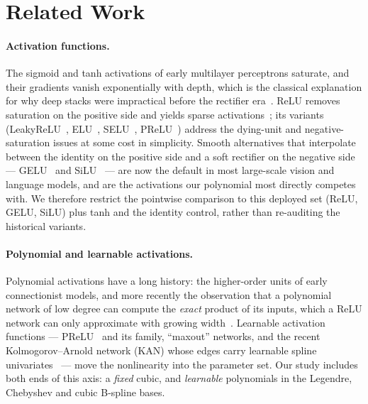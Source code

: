 \section{Related Work}
\label{sec:related}

\paragraph{Activation functions.}
The sigmoid and tanh activations of early multilayer perceptrons saturate, and
their gradients vanish exponentially with depth, which is the classical
explanation for why deep stacks were impractical before the rectifier
era~\citep{glorot2010understanding,glorot2011deep}.
ReLU removes saturation on the positive side and yields sparse
activations~\citep{glorot2011deep}; its variants (LeakyReLU~\citep{maas2013rectifier},
ELU~\citep{clevert2015fast}, SELU~\citep{klambauer2017self},
PReLU~\citep{he2015delving}) address the dying-unit and
negative-saturation issues at some cost in simplicity. Smooth alternatives
that interpolate between the identity on the positive side and a soft
rectifier on the negative side --- GELU~\citep{hendrycks2016gaussian} and
SiLU~\citep{elfwing2018sigmoid,ramachandran2017searching} --- are now the
default in
most large-scale vision and language models, and are the activations our
polynomial most directly competes with. We therefore restrict the pointwise
comparison to this deployed set (ReLU, GELU, SiLU) plus tanh and the identity
control, rather than re-auditing the historical variants.

\paragraph{Polynomial and learnable activations.}
Polynomial activations have a long history: the higher-order units of early
connectionist models, and more recently the observation that a polynomial
network of low degree can compute the \emph{exact} product of its inputs,
which a ReLU network can only approximate with growing
width~\citep{hornik1989multilayer,cybenko1989approximation,izhikevich2007solving,neyshabur2015path}.
Learnable
activation functions --- PReLU~\citep{he2015delving} and its family,
``maxout'' networks, and the
recent Kolmogorov--Arnold network (KAN) whose edges carry learnable spline
univariates~\citep{liu2024kan} --- move the nonlinearity into the parameter
set. Our study
includes both ends of this axis: a \emph{fixed} cubic, and \emph{learnable}
polynomials in the Legendre, Chebyshev and cubic B-spline bases.


